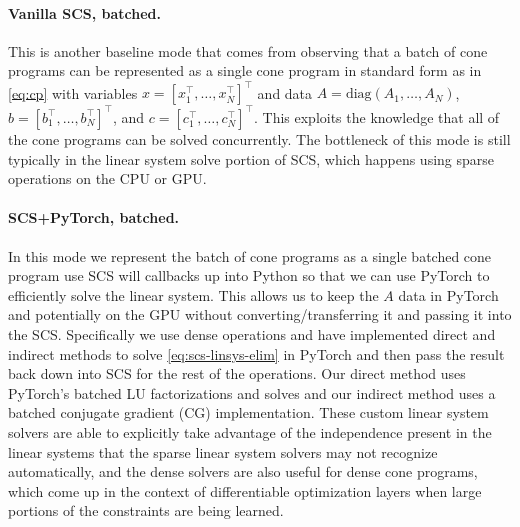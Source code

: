 \paragraph{Vanilla SCS, batched.}
This is another baseline mode that comes from observing that a
batch of cone programs can be represented as
a single cone program in standard form as in \cref{eq:cp} with
variables $x=[x_1^\top, \ldots, x_N^\top]^\top$
and data $A=\mathrm{diag}(A_1, \ldots, A_N)$,
$b=[b_1^\top, \ldots, b_N^\top]^\top$,
and $c=[c_1^\top, \ldots, c_N^\top]^\top$.
This exploits the knowledge that all of the cone programs
can be solved concurrently. The bottleneck of this
mode is still typically in the linear system solve
portion of SCS, which happens using sparse operations
on the CPU or GPU.

\paragraph{SCS+PyTorch, batched.}
In this mode we represent the batch of cone programs as a single
batched cone program use SCS will callbacks up into Python so
that we can use PyTorch to efficiently solve the linear system.
This allows us to keep the $A$ data in PyTorch and potentially
on the GPU without converting/transferring it and passing it
into the SCS.
Specifically we use dense operations and have implemented
direct and indirect methods to solve \cref{eq:scs-linsys-elim}
in PyTorch and then pass the result back down into SCS for the
rest of the operations.
Our direct method uses PyTorch's batched LU factorizations and
solves and our indirect method uses a batched conjugate
gradient (CG) implementation.
These custom linear system solvers are able to explicitly take
advantage of the independence present in the linear systems
that the sparse linear system solvers may not recognize automatically,
and the dense solvers are also useful for dense cone programs,
which come up in the context of differentiable optimization
layers when large portions of the constraints are being learned.

